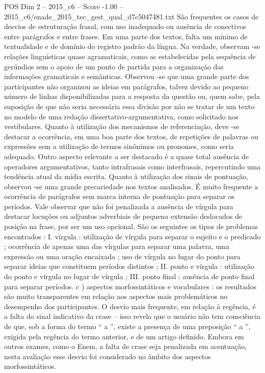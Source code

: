 \begin{textsample}{POS Dim 2 – 2015\_c6 – Score -1.00 – 2015\_c6/enade\_2015\_tec\_gest\_qual\_d7c5047481.txt}
São frequentes os casos de desvios de estruturação frasal, com uso inadequado ou ausência de conectivos entre parágrafos e entre frases.
Em uma parte dos textos, falta um mínimo de textualidade e de domínio do registro padrão da língua.
Na verdade, observam -se relações linguísticas quase agramaticais, como as estabelecidas pela sequência de gerúndios sem o apoio de um ponto de partida para a organização das informações gramaticais e semânticas.
Observou -se que uma grande parte dos participantes não organizou as ideias em parágrafos, talvez devido ao pequeno número de linhas disponibilizadas para a resposta da questão ou, quem sabe, pela suposição de que não seria necessária essa divisão por não se tratar de um texto no modelo de uma redação dissertativo-argumentativa, como solicitado nos vestibulares.
Quanto à utilização dos mecanismos de referenciação, deve -se destacar a ocorrência, em uma boa parte dos textos, de repetições de palavras ou expressões sem a utilização de termos sinônimos ou pronomes, como seria adequado.
Outro aspecto relevante a ser destacado é a quase total ausência de operadores argumentativos, tanto intrafrasais como interfrasais, repercutindo uma tendência atual da mídia escrita.
Quanto à utilização dos sinais de pontuação, observou -se uma grande precariedade nos textos analisados.
É muito frequente a ocorrência de parágrafos sem marca interna de pontuação para separar os períodos.
Vale observar que não foi penalizada a ausência de vírgula para destacar locuções ou adjuntos adverbiais de pequena extensão deslocados de posição na frase, por ser um uso opcional.
São os seguintes os tipos de problemas encontrados : I. vírgula : utilização de vírgula para separar o sujeito e o predicado ; ocorrência de apenas uma das vírgulas para separar uma palavra, uma expressão ou uma oração encaixada ; uso de vírgula no lugar do ponto para separar ideias que constituem períodos distintos ; II. ponto e vírgula : utilização do ponto e vírgula no lugar de vírgula ; III. ponto final : ausência de ponto final para separar períodos. c ) aspectos morfossintáticos e vocabulares : os resultados são muito transparentes em relação aos aspectos mais problemáticos no desempenho dos participantes.
O desvio mais frequente, em relação à regência, é a falta do sinal indicativo da crase – isso revela que o usuário não tem consciência de que, sob a forma do termo “ a ”, existe a presença de uma preposição “ a ”, exigida pela regência do termo anterior, e de um artigo definido.
Embora em outros exames, como o Enem, a falta de crase seja penalizada em acentuação, nesta avaliação esse desvio foi considerado no âmbito dos aspectos morfossintáticos.

\end{textsample}
